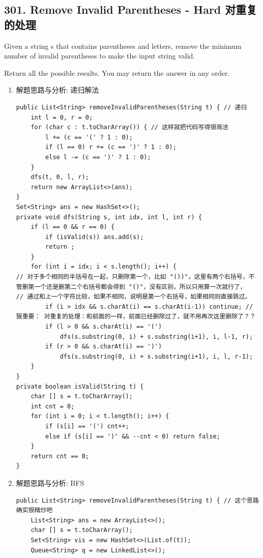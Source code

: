 \documentclass[9pt, b5paaper]{book}
\begin{document}
\subsection{301. Remove Invalid Parentheses - Hard 对重复的处理}
\label{sec-8-0-7}
Given a string s that contains parentheses and letters, remove the minimum number of invalid parentheses to make the input string valid.

Return all the possible results. You may return the answer in any order.
\begin{enumerate}
\item 解题思路与分析: 递归解法
\label{sec-8-0-7-1}
\begin{verbatim}
public List<String> removeInvalidParentheses(String t) { // 递归
    int l = 0, r = 0;
    for (char c : t.toCharArray()) { // 这样就把代码写得很简洁
        l += (c == '(' ? 1 : 0);
        if (l == 0) r += (c == ')' ? 1 : 0);
        else l -= (c == ')' ? 1 : 0);
    }
    dfs(t, 0, l, r);
    return new ArrayList<>(ans);
}
Set<String> ans = new HashSet<>();
private void dfs(String s, int idx, int l, int r) {
    if (l == 0 && r == 0) {
        if (isValid(s)) ans.add(s);
        return ;
    }
    for (int i = idx; i < s.length(); i++) {
// 对于多个相同的半括号在一起，只删除第一个，比如 "())"，这里有两个右括号，不管删第一个还是删第二个右括号都会得到 "()"，没有区别，所以只用算一次就行了，
// 通过和上一个字符比较，如果不相同，说明是第一个右括号，如果相同则直接跳过。
        if (i > idx && s.charAt(i) == s.charAt(i-1)) continue; // 狠重要： 对重复的处理：和前面的一样，前面已经删除过了，就不用再次这里删除了？？
        if (l > 0 && s.charAt(i) == '(')
            dfs(s.substring(0, i) + s.substring(i+1), i, l-1, r);
        if (r > 0 && s.charAt(i) == ')')
            dfs(s.substring(0, i) + s.substring(i+1), i, l, r-1);
    }
}
private boolean isValid(String t) {
    char [] s = t.toCharArray();
    int cnt = 0;
    for (int i = 0; i < t.length(); i++) {
        if (s[i] == '(') cnt++;
        else if (s[i] == ')' && --cnt < 0) return false;
    }
    return cnt == 0;
}
\end{verbatim}
\item 解题思路与分析: BFS
\label{sec-8-0-7-2}
\begin{verbatim}
public List<String> removeInvalidParentheses(String t) { // 这个思路确实很精炒吧
    List<String> ans = new ArrayList<>();
    char [] s = t.toCharArray();
    Set<String> vis = new HashSet<>(List.of(t));
    Queue<String> q = new LinkedList<>();

\end{verbatim}
\end{enumerate}
\end{document}

